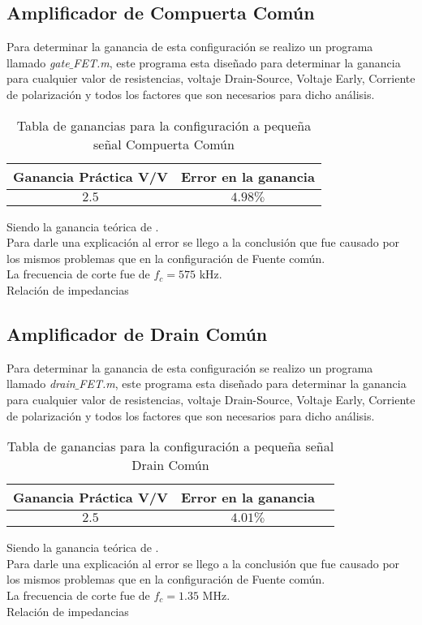 \documentclass[11pt,graphicx,caption,rotating]{article}
\begin{document}
\subsection{Amplificador de Compuerta Común}
\noindent
Para determinar la ganancia de esta configuración se realizo un programa llamado \textit{gate$\_$FET.m}, este programa esta diseñado para determinar la ganancia para cualquier valor de resistencias, voltaje Drain-Source, Voltaje Early, Corriente de polarización y todos los factores que son necesarios para dicho análisis.
\begin{table}[H]
	\centering
\begin{tabular}[c]{|c|c|} \hline
\textbf{Ganancia Práctica} V/V & \textbf{Error en la ganancia} \\ \hline
$2.5$ & $4.98\%$ \\ \hline
\end{tabular}
	\caption{Tabla de ganancias para la configuración a pequeña señal Compuerta Común}
	\label{tab13}
\end{table}
\noindent
Siendo la ganancia teórica de .\\
Para darle una explicación al error se llego a la conclusión que fue causado por los mismos problemas que en la configuración de Fuente común.\\
La frecuencia de corte fue de $f_c=575$ kHz.\\
Relación de impedancias

\subsection{Amplificador de Drain Común}
\noindent
Para determinar la ganancia de esta configuración se realizo un programa llamado \textit{drain$\_$FET.m}, este programa esta diseñado para determinar la ganancia para cualquier valor de resistencias, voltaje Drain-Source, Voltaje Early, Corriente de polarización y todos los factores que son necesarios para dicho análisis.
\begin{table}[H]
	\centering
\begin{tabular}[c]{|c|c|c|} \hline
\textbf{Ganancia Práctica} V/V & \textbf{Error en la ganancia} \\ \hline
$2.5$ & $4.01\%$ \\ \hline
\end{tabular}
	\caption{Tabla de ganancias para la configuración a pequeña señal Drain Común}
	\label{tab14}
\end{table}
\noindent
Siendo la ganancia teórica de .\\
Para darle una explicación al error se llego a la conclusión que fue causado por los mismos problemas que en la configuración de Fuente común.\\
La frecuencia de corte fue de $f_c=1.35$ MHz.\\
Relación de impedancias
\end{document}
